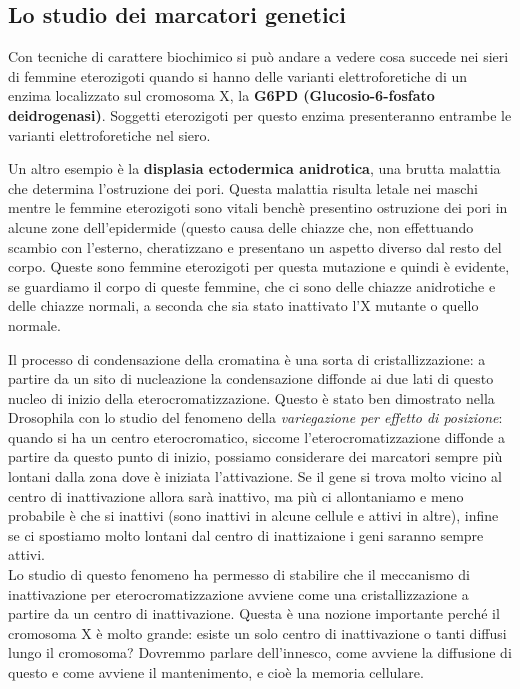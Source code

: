 \documentclass[11pt]{book}
\begin{document}
\subsection{Lo studio dei marcatori genetici}
Con tecniche di carattere biochimico si può andare a vedere cosa succede nei sieri di femmine eterozigoti quando si hanno delle varianti elettroforetiche di un enzima localizzato sul cromosoma X, la \textbf{G6PD (Glucosio-6-fosfato deidrogenasi)}. Soggetti eterozigoti per questo enzima presenteranno entrambe le varianti elettroforetiche nel siero.

Un altro esempio è la \textbf{displasia ectodermica anidrotica}, una brutta malattia che determina l’ostruzione dei pori. Questa malattia risulta letale nei maschi mentre le femmine eterozigoti sono vitali benchè presentino ostruzione dei pori in alcune zone dell’epidermide (questo causa delle chiazze che, non effettuando scambio con l’esterno, cheratizzano e presentano un aspetto diverso dal resto del corpo. Queste sono femmine eterozigoti per questa mutazione e quindi è evidente, se guardiamo il corpo di queste femmine, che ci sono delle chiazze anidrotiche e delle chiazze normali, a seconda che sia stato inattivato l’X mutante o quello normale.

Il processo di condensazione della cromatina è una sorta di cristallizzazione: a partire da un sito di nucleazione la condensazione diffonde ai due lati di questo nucleo di inizio della eterocromatizzazione. Questo è stato ben dimostrato nella Drosophila con lo studio del fenomeno della \emph{variegazione per effetto di posizione}: quando si ha un centro eterocromatico, siccome l’eterocromatizzazione diffonde a partire da questo punto di inizio, possiamo considerare dei marcatori sempre più lontani dalla zona dove è iniziata l’attivazione. Se il gene si trova molto vicino al centro di inattivazione allora sarà inattivo, ma più ci allontaniamo e meno probabile è che si inattivi (sono inattivi in alcune cellule e attivi in altre), infine se ci spostiamo molto lontani dal centro di inattizaione i geni saranno sempre attivi.\\
Lo studio di questo fenomeno ha permesso di stabilire che il meccanismo di inattivazione per eterocromatizzazione avviene come una cristallizzazione a partire da un centro di inattivazione. Questa è una nozione importante perché il cromosoma X è molto grande: esiste un solo centro di inattivazione o tanti diffusi lungo il cromosoma? Dovremmo parlare dell’innesco, come avviene la diffusione di questo e come avviene il mantenimento, e cioè la memoria cellulare. 
\end{document}
